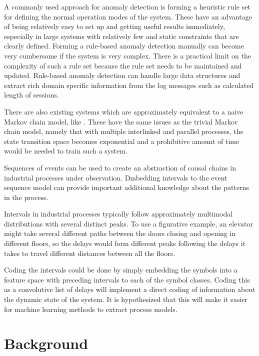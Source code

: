 \documentclass[a4paper,10pt]{article}
\begin{document}
A commonly used approach for anomaly detection is forming a heuristic rule set for defining the normal operation modes of the system. These have an advantage of being
relatively easy
to set up and getting useful results immediately, especially in large systems with relatively few and static constraints that are clearly defined.
Forming a rule-based anomaly detection manually can become very cumbersome if the system is very complex. There is a practical limit on the complexity of such a rule set because
the rule set needs to be maintained and updated. Rule-based anomaly detection can handle large data structures and extract rich domain specific information from
the log messages such as calculated length of sessions.

There are also existing systems which are approximately equivalent to a naive Markov chain model, like \cite{langer2011self}. These have the same issues as the trivial Markov
chain model, namely that with multiple interlinked and parallel processes, the state transition space becomes exponential and a prohibitive amount of time would be needed
to train such a system.

Sequences of events can be used to create an abstraction of causal chains in industrial processes under observation. Dmbedding intervals to the event sequence model
can provide important additional knowledge about the patterns in the process.

Intervals in industrial processes typically follow approximately multimodal distributions with several distinct peaks.
To use a figurative example, an elevator might take several different paths between the doors closing and opening in different floors, so the delays would form different
peaks following the delays it takes to travel different distances between all the floors.

Coding the intervals could be done by simply embedding the symbols into a feature space with preceding intervals to
each of the symbol classes. Coding this as a convolutive list of delays will implement a direct coding of information about the dynamic state of the system. It is hypothesized that
this will make it easier for machine learning methods to extract process models.

\section{Background}
\end{document}
